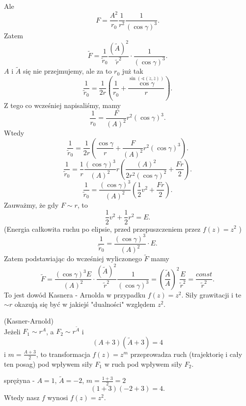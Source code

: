 \documentclass[../main.tex]{subfiles}
\begin{document}
Ale
\[
    F = \frac{A^2}{r_0}\frac{1}{r^2}\frac{1}{\left( \cos\gamma \right) ^3}
.\]
Zatem
\[
    \tilde F = \frac{1}{\tilde r_0}\frac{(\tilde A)^2}{\tilde r^2}\cdot \frac{1}{\left( \cos\gamma \right) ^3}
.\]
$A$ i $\tilde A$ się nie przejmujemy, ale za to $r_0$ już tak
\[
    \frac{1}{\tilde r_0} = \frac{1}{2 r}\left( \frac{1}{r_0} + \frac{\overset{\sin(\sphericalangle(\dot{z}, \overline{z}))}{\cos\gamma}}{r} \right)
.\]
Z tego co wcześniej napisaliśmy, mamy
\[
    \frac{1}{r_0} = \frac{F}{(A)^2}r^2(\cos\gamma)^3
.\]
Wtedy
\[
    \frac{1}{\tilde r_0} = \frac{1}{2r}\left( \frac{\cos\gamma}{r} + \frac{F}{(A)^2}r^2(\cos\gamma)^3 \right)
.\]
\[
    \frac{1}{\tilde r_0} = \frac{1}{r}\frac{(\cos\gamma)^3}{(A)^2}r\left( \frac{(A)^2}{2r^2(\cos\gamma)^2} + \frac{Fr}{2} \right)
.\]
\[
    \frac{1}{\tilde r_0} = \frac{(\cos\gamma)^3}{(A)^2}\left( \frac{1}{2}v^2 + \frac{Fr}{2} \right)
.\]
Zauważmy, że gdy $F \sim r$, to
 \[
     \frac{1}{2}v^2 + \frac{1}{2}r^2 = E
.\]
(Energia całkowita ruchu po elipsie, przed przepuszczeniem przez $f(z) = z^2$ )
\[
    \frac{1}{\tilde r_0} = \frac{(\cos\gamma)^3}{\left( A \right) ^2} \cdot E
.\]
Zatem podstawiając do wcześniej wyliczonego $\tilde F$ mamy
\[
    \tilde F = \frac{(\cos\gamma)^3 E}{(A)^2}\cdot \frac{(\tilde A)^2}{\tilde r^2}\frac{1}{(\cos\gamma)^3} = \left( \frac{\tilde A}{A} \right) ^2 \frac{E}{\tilde r^2} = \frac{const}{\tilde r^2}
.\]
To jest dowód Kasnera - Arnolda w przypadku $f(z) = z^2$. Siły grawitacji i te $\sim r$ okazują się być w jakiejś "dualności" względem $z^2$.
\begin{tw}
    (Kasner-Arnold)\\
    Jeżeli $F_1\sim r^A$, a $F_2\sim r^{\tilde A}$ i
    \[
        \left( A+3 \right)(\tilde A + 3) = 4
    \]
    i $m = \frac{A+3}{2}$, to transformacja $f(z) = z^m$ przeprowadza ruch (trajektorię i cały ten posag) pod wpływem siły $F_1$ w ruch pod wpływem siły $F_2$.
\end{tw}
\begin{przyklad}
    sprężyna - $A = 1$, $\tilde A = -2$, $m = \frac{1+3}{2} = 2$
    \[
        (1+3)(-2+3) = 4
    .\]
Wtedy nasz $f$ wynosi $f(z) = z^2$.
\end{przyklad}
\end{document}
